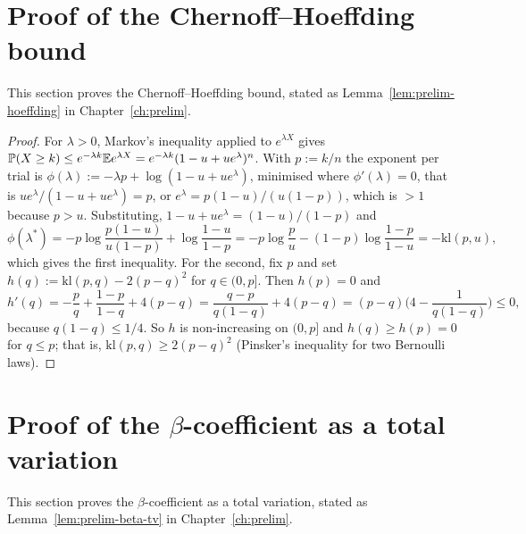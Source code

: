 \documentclass[../../main.tex]{subfiles}
\begin{document}
\section{Proof of the Chernoff--Hoeffding bound}\label{appB:hoeffding}

This section proves the Chernoff--Hoeffding bound, stated as Lemma~\ref{lem:prelim-hoeffding} in Chapter~\ref{ch:prelim}.

\begin{proof}
For $\lambda>0$, Markov's inequality applied to $e^{\lambda X}$ gives $\mathbb{P}(X\ge k)\le e^{-\lambda k}\mathbb{E} e^{\lambda X}=e^{-\lambda k}(1-u+ue^{\lambda})^n$. With $p:=k/n$ the exponent per trial is $\phi(\lambda):=-\lambda p+\log(1-u+ue^{\lambda})$, minimised where $\phi'(\lambda)=0$, that is $ue^\lambda/(1-u+ue^\lambda)=p$, or $e^\lambda=p(1-u)/(u(1-p))$, which is $>1$ because $p>u$. Substituting, $1-u+ue^\lambda=(1-u)/(1-p)$ and
\[
\phi(\lambda^*)=-p\log\frac{p(1-u)}{u(1-p)}+\log\frac{1-u}{1-p}=-p\log\frac pu-(1-p)\log\frac{1-p}{1-u}=-\mathrm{kl}(p,u),
\]
which gives the first inequality. For the second, fix $p$ and set $h(q):=\mathrm{kl}(p,q)-2(p-q)^2$ for $q\in(0,p]$. Then $h(p)=0$ and
\[
h'(q)=-\frac pq+\frac{1-p}{1-q}+4(p-q)=\frac{q-p}{q(1-q)}+4(p-q)=(p-q)\Big(4-\frac1{q(1-q)}\Big)\le0,
\]
because $q(1-q)\le1/4$. So $h$ is non-increasing on $(0,p]$ and $h(q)\ge h(p)=0$ for $q\le p$; that is, $\mathrm{kl}(p,q)\ge2(p-q)^2$ (Pinsker's inequality for two Bernoulli laws).
\end{proof}

\section{Proof of the $\beta$-coefficient as a total variation}\label{appB:betatv}

This section proves the $\beta$-coefficient as a total variation, stated as Lemma~\ref{lem:prelim-beta-tv} in Chapter~\ref{ch:prelim}.
\end{document}
